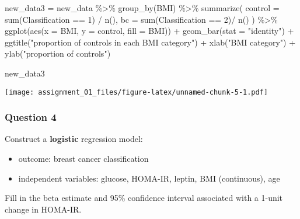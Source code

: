 \documentclass[
]{article}
\newenvironment{Shaded}{\begin{snugshade}}{\end{snugshade}}
\newcommand{\AttributeTok}[1]{\textcolor[rgb]{0.77,0.63,0.00}{#1}}
\newcommand{\DecValTok}[1]{\textcolor[rgb]{0.00,0.00,0.81}{#1}}
\newcommand{\FunctionTok}[1]{\textcolor[rgb]{0.00,0.00,0.00}{#1}}
\newcommand{\NormalTok}[1]{#1}
\newcommand{\OtherTok}[1]{\textcolor[rgb]{0.56,0.35,0.01}{#1}}
\newcommand{\SpecialCharTok}[1]{\textcolor[rgb]{0.00,0.00,0.00}{#1}}
\newcommand{\StringTok}[1]{\textcolor[rgb]{0.31,0.60,0.02}{#1}}
\providecommand{\tightlist}{%
  \setlength{\itemsep}{0pt}\setlength{\parskip}{0pt}}
\begin{document}
\begin{Shaded}
\begin{Highlighting}[]
\NormalTok{new\_data3 }\OtherTok{=}
\NormalTok{new\_data }\SpecialCharTok{\%\textgreater{}\%} 
  \FunctionTok{group\_by}\NormalTok{(BMI) }\SpecialCharTok{\%\textgreater{}\%} 
  \FunctionTok{summarize}\NormalTok{(}
    \AttributeTok{control =} \FunctionTok{sum}\NormalTok{(Classification }\SpecialCharTok{==} \DecValTok{1}\NormalTok{) }\SpecialCharTok{/} \FunctionTok{n}\NormalTok{(),}
    \AttributeTok{bc =} \FunctionTok{sum}\NormalTok{(Classification }\SpecialCharTok{==} \DecValTok{2}\NormalTok{)}\SpecialCharTok{/} \FunctionTok{n}\NormalTok{()}
\NormalTok{  ) }\SpecialCharTok{\%\textgreater{}\%} 
  \FunctionTok{ggplot}\NormalTok{(}\FunctionTok{aes}\NormalTok{(}\AttributeTok{x =}\NormalTok{ BMI, }\AttributeTok{y =}\NormalTok{ control, }\AttributeTok{fill =}\NormalTok{ BMI)) }\SpecialCharTok{+}
  \FunctionTok{geom\_bar}\NormalTok{(}\AttributeTok{stat =} \StringTok{"identity"}\NormalTok{) }\SpecialCharTok{+} 
  \FunctionTok{ggtitle}\NormalTok{(}\StringTok{"proportion of controls in each BMI category"}\NormalTok{) }\SpecialCharTok{+}
  \FunctionTok{xlab}\NormalTok{(}\StringTok{"BMI category"}\NormalTok{) }\SpecialCharTok{+} \FunctionTok{ylab}\NormalTok{(}\StringTok{"proportion of controls"}\NormalTok{)}

\NormalTok{new\_data3}
\end{Highlighting}
\end{Shaded}

\texttt{[image: assignment\_01\_files/figure-latex/unnamed-chunk-5-1.pdf]}

\hypertarget{question-4}{%
\subsubsection{Question 4}\label{question-4}}

Construct a \textbf{logistic} regression model:

\begin{itemize}
\tightlist
\item
  outcome: breast cancer classification\\
\item
  independent variables: glucose, HOMA-IR, leptin, BMI (continuous), age
\end{itemize}

Fill in the beta estimate and 95\% confidence interval associated with a
1-unit change in HOMA-IR.
\end{document}
